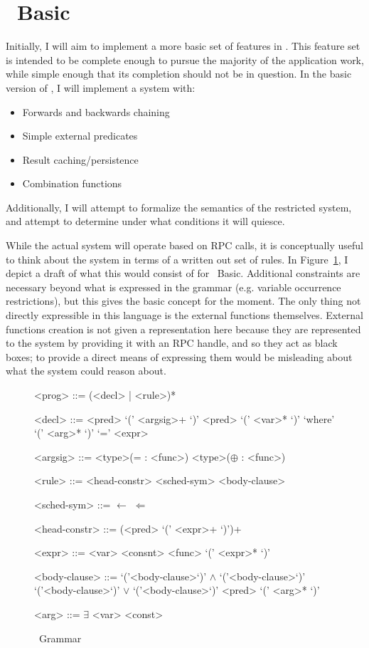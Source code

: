 \section{\sysname\ Basic}
\label{sec:holmesBasic}
Initially, I will aim to implement a more basic set of features in \sysname.
This feature set is intended to be complete enough to pursue the majority of the application work, while simple enough that its completion should not be in question.
In the basic version of \sysname, I will implement a system with:
\begin{itemize}
\item Forwards and backwards chaining
\item Simple external predicates
\item Result caching/persistence
\item Combination functions
\end{itemize}
Additionally, I will attempt to formalize the semantics of the restricted system, and attempt to determine under what conditions it will quiesce.

While the actual system will operate based on RPC calls, it is conceptually useful to think about the system in terms of a written out set of rules.
In Figure~\ref{fig:holmesGrammar}, I depict a draft of what this would consist of for \sysname\ Basic.
Additional constraints are necessary beyond what is expressed in the grammar (e.g. variable occurrence restrictions), but this gives the basic concept for the moment.
The only thing not directly expressible in this language is the external functions themselves.
External functions creation is not given a representation here because they are represented to the system by providing it with an RPC handle, and so they act as black boxes;
to provide a direct means of expressing them would be misleading about what the system could reason about.

\begin{figure}
\begin{grammar}

<prog> ::= (<decl> | <rule>)*

<decl> ::= <pred> `(' <argsig>+ `)'
\alt <pred> `(' <var>* `)' `where' `(' <arg>* `)' `=' <expr>

<argsig>
::=  <type>(= : <func>)
\alt <type>($\oplus$ : <func>)

<rule> ::= <head-constr> <sched-sym> <body-clause>

<sched-sym> ::= $\leftarrow$
\alt $\Leftarrow$

<head-constr> ::= (<pred> `(' <expr>+ `)')+

<expr> ::= <var>
\alt <consnt>
\alt <func> `(' <expr>* `)'

<body-clause>
::=  `('<body-clause>`)' $\wedge$ `('<body-clause>`)'
\alt `('<body-clause>`)' $\vee$ `('<body-clause>`)'
\alt <pred> `(' <arg>* `)'

<arg> ::= $\exists$ \alt <var> \alt <const>
\end{grammar}
\label{fig:holmesGrammar}
\caption{\sysname\ Grammar}
\end{figure}

